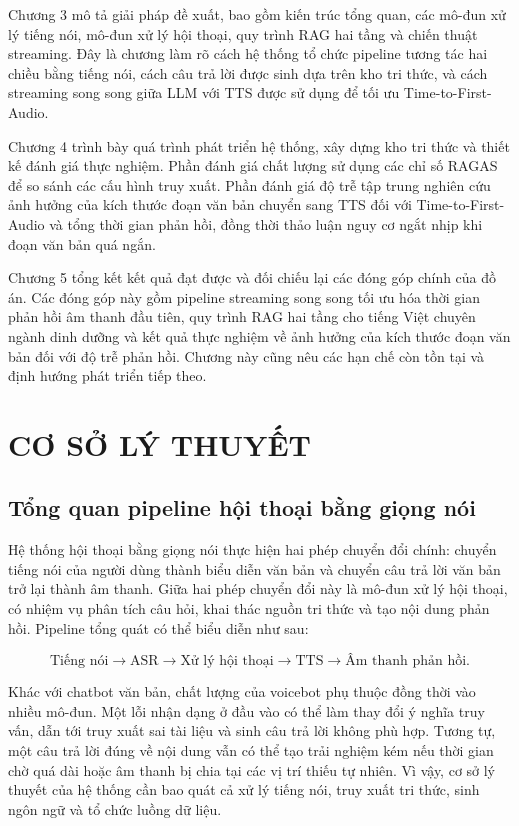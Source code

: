\documentclass[a4paper,13pt,oneside]{report}
\begin{document}
Chương 3 mô tả giải pháp đề xuất, bao gồm kiến trúc tổng quan, các mô-đun xử lý tiếng nói, mô-đun xử lý hội thoại, quy trình RAG hai tầng và chiến thuật streaming. Đây là chương làm rõ cách hệ thống tổ chức pipeline tương tác hai chiều bằng tiếng nói, cách câu trả lời được sinh dựa trên kho tri thức, và cách streaming song song giữa LLM với TTS được sử dụng để tối ưu Time-to-First-Audio.

Chương 4 trình bày quá trình phát triển hệ thống, xây dựng kho tri thức và thiết kế đánh giá thực nghiệm. Phần đánh giá chất lượng sử dụng các chỉ số RAGAS để so sánh các cấu hình truy xuất. Phần đánh giá độ trễ tập trung nghiên cứu ảnh hưởng của kích thước đoạn văn bản chuyển sang TTS đối với Time-to-First-Audio và tổng thời gian phản hồi, đồng thời thảo luận nguy cơ ngắt nhịp khi đoạn văn bản quá ngắn.

Chương 5 tổng kết kết quả đạt được và đối chiếu lại các đóng góp chính của đồ án. Các đóng góp này gồm pipeline streaming song song tối ưu hóa thời gian phản hồi âm thanh đầu tiên, quy trình RAG hai tầng cho tiếng Việt chuyên ngành dinh dưỡng và kết quả thực nghiệm về ảnh hưởng của kích thước đoạn văn bản đối với độ trễ phản hồi. Chương này cũng nêu các hạn chế còn tồn tại và định hướng phát triển tiếp theo.

\chapter{CƠ SỞ LÝ THUYẾT}

\section{Tổng quan pipeline hội thoại bằng giọng nói}

Hệ thống hội thoại bằng giọng nói thực hiện hai phép chuyển đổi chính: chuyển tiếng nói của người dùng thành biểu diễn văn bản và chuyển câu trả lời văn bản trở lại thành âm thanh. Giữa hai phép chuyển đổi này là mô-đun xử lý hội thoại, có nhiệm vụ phân tích câu hỏi, khai thác nguồn tri thức và tạo nội dung phản hồi. Pipeline tổng quát có thể biểu diễn như sau:

\begin{equation}
    \text{Tiếng nói}
    \rightarrow \text{ASR}
    \rightarrow \text{Xử lý hội thoại}
    \rightarrow \text{TTS}
    \rightarrow \text{Âm thanh phản hồi}.
\end{equation}

Khác với chatbot văn bản, chất lượng của voicebot phụ thuộc đồng thời vào nhiều mô-đun. Một lỗi nhận dạng ở đầu vào có thể làm thay đổi ý nghĩa truy vấn, dẫn tới truy xuất sai tài liệu và sinh câu trả lời không phù hợp. Tương tự, một câu trả lời đúng về nội dung vẫn có thể tạo trải nghiệm kém nếu thời gian chờ quá dài hoặc âm thanh bị chia tại các vị trí thiếu tự nhiên. Vì vậy, cơ sở lý thuyết của hệ thống cần bao quát cả xử lý tiếng nói, truy xuất tri thức, sinh ngôn ngữ và tổ chức luồng dữ liệu.
\end{document}
